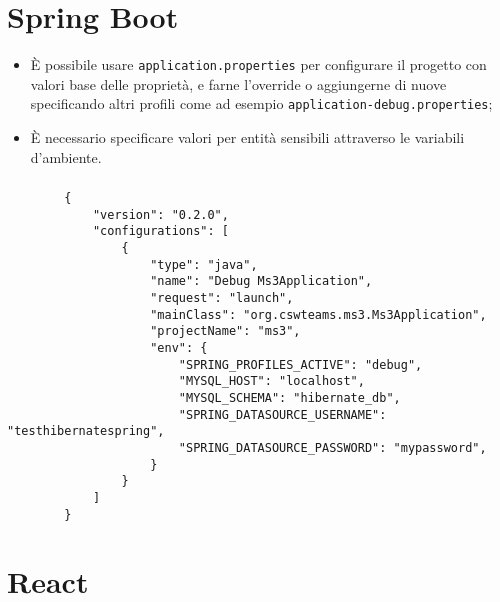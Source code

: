 \documentclass[compress]{beamer}
\begin{document}
\section{Spring Boot}
\begin{frame}{\secname}
    \begin{itemize}
        \item È possibile usare \texttt{application.properties} per configurare il
        progetto con valori base delle proprietà, e farne l'override o aggiungerne di nuove
        specificando altri profili come ad esempio \texttt{application-debug.properties};
        \item È necessario specificare valori per entità sensibili attraverso le variabili
        d'ambiente.
    \end{itemize}
\end{frame}
\begin{frame}[fragile]
    \frametitle{\secname}
    \begin{verbatim}
        {
            "version": "0.2.0",
            "configurations": [
                {
                    "type": "java",
                    "name": "Debug Ms3Application",
                    "request": "launch",
                    "mainClass": "org.cswteams.ms3.Ms3Application",
                    "projectName": "ms3",
                    "env": {
                        "SPRING_PROFILES_ACTIVE": "debug",
                        "MYSQL_HOST": "localhost",
                        "MYSQL_SCHEMA": "hibernate_db",
                        "SPRING_DATASOURCE_USERNAME": "testhibernatespring",
                        "SPRING_DATASOURCE_PASSWORD": "mypassword",
                    }
                }
            ]
        }
    \end{verbatim}  
\end{frame}

\section{React}

\begin{frame}
    \frametitle{\secname}


\end{frame}
\end{document}
